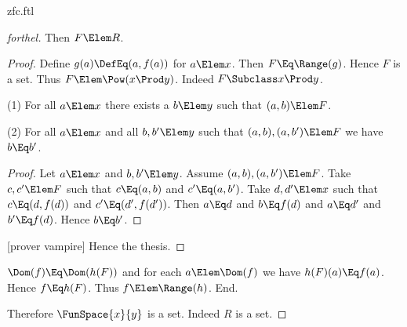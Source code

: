 \documentclass{stex}
\begin{document}
\begin{smodule}{zfc.ftl}
\begin{proof}[forthel]
    Then $F \Elem R$.
    \begin{proof}
      Define $g(a) \DefEq (a,f(a))$ for $a \Elem x$.
      Then $F \Eq \Range(g)$.
      Hence $F$ is a set.
      Thus $F \Elem \Pow(x \Prod y)$.
      Indeed $F \Subclass x \Prod y$.

      (1) For all $a \Elem x$ there exists a $b \Elem y$ such that $(a,b) \Elem F$.

      (2) For all $a \Elem x$ and all $b, b' \Elem y$ such that $(a,b),
      (a,b') \Elem F$ we have $b \Eq b'$.
      \begin{proof}
        Let $a \Elem x$ and $b, b' \Elem y$.
        Assume $(a,b), (a,b') \Elem F$.
        Take $c, c' \Elem F$ such that $c \Eq (a,b)$ and $c' \Eq (a,b')$.
        Take $d, d' \Elem x$ such that $c \Eq (d,f(d))$ and $c' \Eq (d',f(d'))$.
        Then $a \Eq d$ and $b \Eq f(d)$ and $a \Eq d'$ and $b' \Eq f(d)$.
        Hence $b \Eq b'$.
      \end{proof}

      [prover vampire]
      Hence the thesis.
    \end{proof}

    $\Dom(f) \Eq \Dom(h(F))$ and for each $a \Elem \Dom(f)$ we have $h(F)(a) \Eq f(a)$.
    Hence $f \Eq h(F)$.
    Thus $f \Elem \Range(h)$.
  End.

  Therefore $\FunSpace{x}{y}$ is a set.
  Indeed $R$ is a set.
\end{proof}

\end{smodule}
\end{document}
